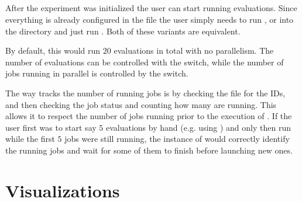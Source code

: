 \subsection{}

After the experiment was initialized the user can start running evaluations. Since everything is already configured in the  file the user simply needs to run , or  into the directory and just run . Both of these variants are equivalent.

By default, this would run $20$ evaluations in total with no parallelism. The number of evaluations can be controlled with the  switch, while the number of jobs running in parallel is controlled by the  switch.

The way  tracks the number of running jobs is by checking the  file for the IDs, and then checking the job status and counting how many are running. This allows it to respect the number of jobs running prior to the execution of . If the user first was to start say $5$ evaluations by hand (e.g. using ) and only then run  while the first $5$ jobs were still running, the instance of  would correctly identify the running jobs and wait for some of them to finish before launching new ones.

\section{Visualizations}